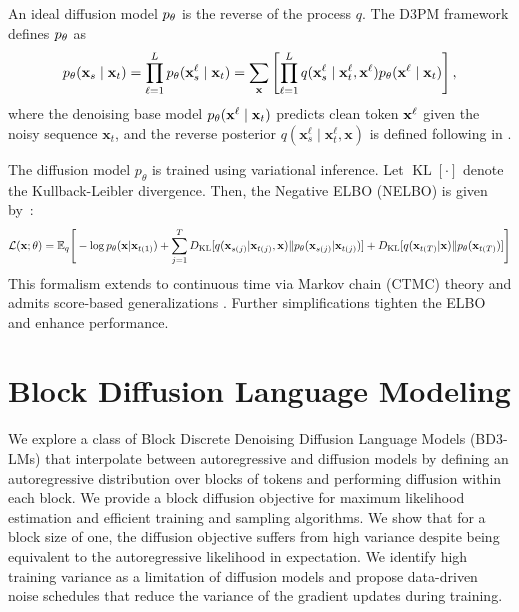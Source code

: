 \documentclass{article} %
\def\algofull{Block Discrete Denoising Diffusion Language Models}
\def\algos{BD3-LMs}
\begin{document}
An ideal diffusion model ${p_\theta}$ is the reverse of the process $q$. The D3PM framework defines ${p_\theta}$ as
\begin{align}\label{eqn:diffusion}
    p_\theta({\mathbf x}_s \mid {\mathbf x}_t) = \prod_{\ell=1}^L p_\theta({\mathbf x}^\ell_s \mid {\mathbf x}_t) = \sum_{{\mathbf x}} \left[\prod_{\ell=1}^L q({\mathbf x}^\ell_s \mid {\mathbf x}^\ell_t, {\mathbf x}^\ell) p_\theta({\mathbf x}^\ell \mid {\mathbf x}_t)\right],
\end{align}
where the denoising base model ${p_\theta}({\mathbf x}^\ell \mid {\mathbf x}_t)$ predicts clean token ${\mathbf x}^\ell$ given the noisy sequence $\mathbf{x}_t$, and the reverse posterior $q(\mathbf{x}^\ell_s \mid \mathbf{x}^\ell_t, \mathbf{x})$ is defined following \citet{austin2021structured} in . 

The diffusion model $p_\theta$ is trained using variational inference. Let $\operatorname{KL}[\cdot]$ denote the Kullback-Leibler divergence. Then, the Negative ELBO (NELBO) is given by~\citep{sohl2015deep}:
{\footnotesize
\begin{align}\label{eqn:elbo}
    \mathcal{L}({\mathbf x}; \theta) = \mathbb{E}_q\Bigg[- \log p_\theta(
    {\mathbf x} | {\mathbf x}_{t(1)}) + \sum_{j=1}^T D_{\mathrm{KL}}[q({\mathbf x}_{s(j)} | {\mathbf x}_{t(j)}, {\mathbf x}) \| p_\theta({\mathbf x}_{s(j)} | {\mathbf x}_{t(j)})]
    + D_{\mathrm{KL}}[q({\mathbf x}_{t(T)} | {\mathbf x}) \| p_\theta({\mathbf x}_{t(T)})] \Bigg]
\end{align}
}
This formalism extends to continuous time via Markov chain (CTMC) theory and admits score-based generalizations \citep{song2019generative, lou2024discrete, sun2022score}. Further simplifications \citep{sahoo2024simple, shi2024simplified, ou2025your} tighten the ELBO and enhance performance.

\section{Block Diffusion Language Modeling}
We explore a class of \algofull{} (\algos{}) that interpolate between autoregressive and diffusion models by defining an autoregressive distribution over blocks of tokens and performing diffusion within each block. We provide a block diffusion objective for maximum likelihood estimation and efficient training and sampling algorithms. We show that for a block size of one, the diffusion objective suffers from high variance despite being equivalent to the autoregressive likelihood in expectation. We identify high training variance as a limitation of diffusion models and propose data-driven noise schedules that reduce the variance of the gradient updates during training. 
\end{document}
